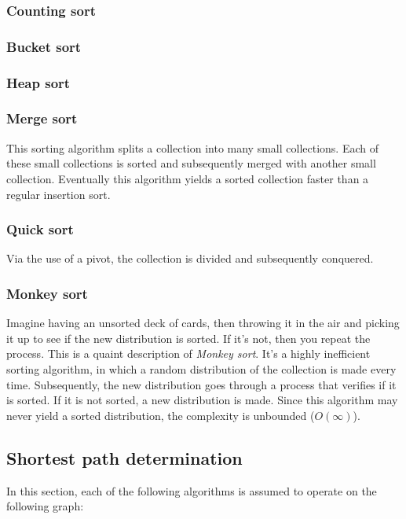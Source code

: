 \documentclass{article}
\begin{document}
\subsubsection{Counting sort}

\subsubsection{Bucket sort}

\subsubsection{Heap sort}

\subsubsection{Merge sort}
This sorting algorithm splits a collection into many small collections.
Each of these small collections is sorted and subsequently merged with another small collection.
Eventually this algorithm yields a sorted collection faster than a regular insertion sort.

\subsubsection{Quick sort}
Via the use of a pivot, the collection is divided and subsequently conquered.

\subsubsection{Monkey sort}
Imagine having an unsorted deck of cards, then throwing it in the air and picking it up to see if the new distribution is sorted.
If it's not, then you repeat the process. This is a quaint description of {\em Monkey sort}.
It's a highly inefficient sorting algorithm, in which a random distribution of the collection is made every time.
Subsequently, the new distribution goes through a process that verifies if it is sorted. If it is not sorted, a new distribution is made.
Since this algorithm may never yield a sorted distribution, the complexity is unbounded ($O(\infty)$).

\newpage

\subsection{Shortest path determination}
In this section, each of the following algorithms is assumed to operate on the following graph:
\end{document}
